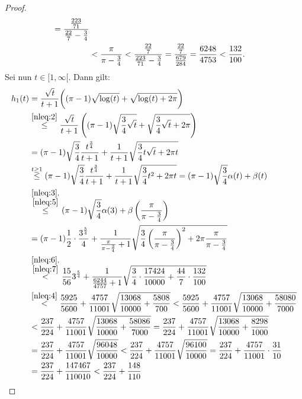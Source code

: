 \begin{proof}
\begin{align}
= \frac{\frac{223}{71}}{\frac {22} 7 - \frac 3 4}\notag\\ 
&< \frac{\pi}{\pi - \frac 3 4} < \frac{\frac {22}7}{\frac{223}{71}-\frac 3 4}
 = \frac{\frac {22}7}{\frac{679}{284}}= \frac{6248}{4753} < 
 \frac{132}{100}\text. \label{nleq:7} \end{align}
Sei nun $t \in [1, \infty[$. Dann gilt:
\begin{align*}
h_1(t)& = \frac{\sqrt t}{t+1}
\bigg((\pi-1)\sqrt{\log(t)}+\sqrt{\log(t)+2\pi}\bigg)\\
&\overset{\eqref{nleq:2}}\le
\frac{\sqrt t}{t+1}
\left((\pi-1)\sqrt{ \frac 3 4 \sqrt t }+\sqrt{\frac 3 4 \sqrt t +2\pi}\right)\\
&= (\pi-1)\sqrt{\frac 3 4}\frac {t^{\frac 3 4}}{t+1}
 + \frac 1 {t+1}\sqrt{\frac 3 4 t \sqrt t +  2\pi t}\\
&\overset{t \ge 1}\le(\pi-1)\sqrt{\frac 3 4}\frac {t^{\frac 3 4}}{t+1} + 
\frac 1 {t+1}\sqrt{\frac 3 4 t^2 +  2\pi t} 
= (\pi-1)\sqrt{\frac 3 4}\alpha(t) + \beta(t)\\
&\overset{\substack{\eqref{nleq:3},\\\eqref{nleq:5}}}\le 
(\pi-1)\sqrt{\frac 3 4}\alpha(3)
 + \beta\left(\frac{\pi}{\pi -  \frac 3 4} \right)\\
 &= (\pi-1)\frac 1 2 \cdot \frac{3^{\frac 5 4}}4 + 
 \frac 1 {\frac{\pi}{\pi -  \frac 3 4} + 1}
 \sqrt{\frac 3 4 \left(\frac{\pi} {\pi -  \frac 3 4} \right)^2 
 + 2\pi\frac{\pi}{\pi -  \frac 3 4}}\\
 &\overset{\substack{\eqref{nleq:6},\\\eqref{nleq:7}}}< 
 \frac{15}{56}3^{\frac 5 4} +
 \frac 1 {\frac{6244}{4757}+1}
 \sqrt{\frac 3 4 \cdot
  \frac{17424}{10000}+\frac{44}{7}\cdot\frac{132}{100}}\\
 &\overset{\eqref{nleq:4}}< \frac{5925}{5600} + \frac{4757}{11001}\sqrt{ 
  \frac{13068}{10000}+\frac{5808}{700}}
  < \frac{5925}{5600} + \frac{4757}{11001}
  \sqrt{\frac{13068}{10000}+\frac{58080}{7000}} \\
  &<\frac{237}{224} + \frac{4757}{11001}
  \sqrt{\frac{13068}{10000}+\frac{58086}{7000}}
  =\frac{237}{224} + \frac{4757}{11001}
  \sqrt{\frac{13068}{10000}+\frac{8298}{1000}}\\
  &=\frac{237}{224} + \frac{4757}{11001}
  \sqrt{\frac{96048}{10000}}
  < \frac{237}{224} + \frac{4757}{11001}
  \sqrt{\frac{96100}{10000}}
  = \frac{237}{224} + \frac{4757}{11001} \cdot \frac{31}{10}\\
  &= \frac{237}{224} + \frac{147467}{110010}
  < \frac{237}{224} + \frac{148}{110}

\end{align*}
\end{proof}
